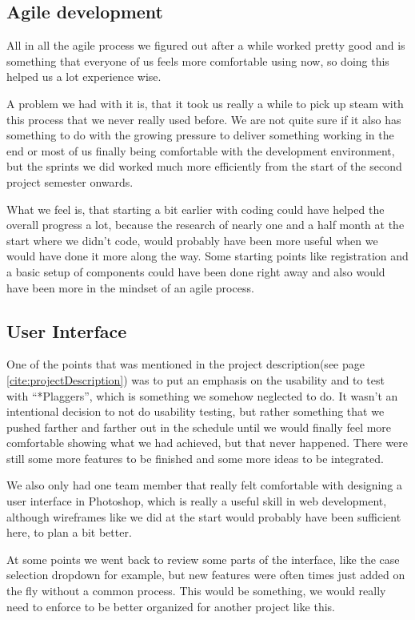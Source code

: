 \subsection{Agile development}

All in all the agile process we figured out after a while worked pretty good and is something that everyone of us feels more comfortable using now, so doing this helped us a lot experience wise. 

A problem we had with it is, that it took us really a while to pick up steam with this process that we never really used before. We are not quite sure if it also has something to do with the growing pressure to deliver something working in the end or most of us finally being comfortable with the development environment, but the sprints we did worked much more efficiently from the start of the second project semester onwards.

What we feel is, that starting a bit earlier with coding could have helped the overall progress a lot, because the research of nearly one and a half month at the start where we didn't code, would probably have been more useful when we would have done it more along the way. Some starting points like registration and a basic setup of components could have been done right away and also would have been more in the mindset of an agile process.

\subsection{User Interface}

One of the points that was mentioned in the project description(see page \ref{cite:projectDescription}) was to put an emphasis on the usability and to test with \enquote{*Plaggers}, which is something we somehow neglected to do. It wasn't an intentional decision to not do usability testing, but rather something that we pushed farther and farther out in the schedule until we would finally feel more comfortable showing what we had achieved, but that never happened. There were still some more features to be finished and some more ideas to be integrated.

We also only had one team member that really felt comfortable with designing a user interface in Photoshop, which is really a useful skill in web development, although wireframes like we did at the start would probably have been sufficient here, to plan a bit better. 

At some points we went back to review some parts of the interface, like the case selection dropdown for example, but new features were often times just added on the fly without a common process. This would be something, we would really need to enforce to be better organized for another project like this.

